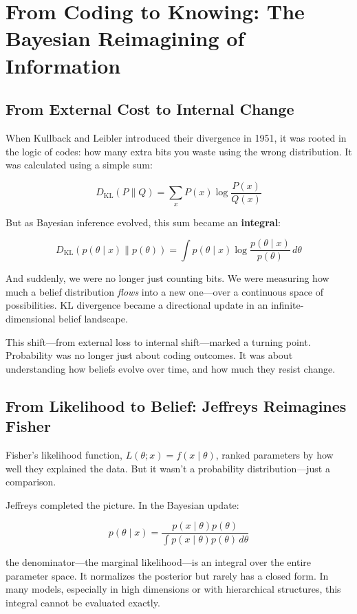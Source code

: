 \section{From Coding to Knowing: The Bayesian Reimagining of Information}

\subsection{From External Cost to Internal Change}

When Kullback and Leibler introduced their divergence in 1951, it was rooted in the logic of codes: how many extra bits you waste using the wrong distribution. It was calculated using a simple sum:

\[
D_{\mathrm{KL}}(P \parallel Q) = \sum_x P(x) \log \frac{P(x)}{Q(x)}
\]

But as Bayesian inference evolved, this sum became an \textbf{integral}:

\[
D_{\mathrm{KL}}(p(\theta \mid x) \parallel p(\theta)) = \int p(\theta \mid x) \log \frac{p(\theta \mid x)}{p(\theta)} \, d\theta
\]

And suddenly, we were no longer just counting bits. We were measuring how much a belief distribution \emph{flows} into a new one—over a continuous space of possibilities. KL divergence became a directional update in an infinite-dimensional belief landscape.

This shift—from external loss to internal shift—marked a turning point. Probability was no longer just about coding outcomes. It was about understanding how beliefs evolve over time, and how much they resist change.

\subsection{From Likelihood to Belief: Jeffreys Reimagines Fisher}

Fisher’s likelihood function, \( L(\theta; x) = f(x \mid \theta) \), ranked parameters by how well they explained the data. But it wasn’t a probability distribution—just a comparison.

Jeffreys completed the picture. In the Bayesian update:

\[
p(\theta \mid x) = \frac{p(x \mid \theta)p(\theta)}{\int p(x \mid \theta)p(\theta)\, d\theta}
\]

the denominator—the marginal likelihood—is an integral over the entire parameter space. It normalizes the posterior but rarely has a closed form. In many models, especially in high dimensions or with hierarchical structures, this integral cannot be evaluated exactly.

